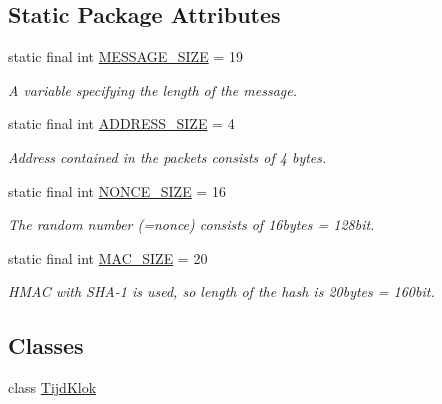 \subsection*{Static Package Attributes}
\begin{CompactItemize}
\item 
\hypertarget{class_kryptoknight_u0}{
static final int \hyperlink{class_kryptoknight_u0}{MESSAGE\_\-SIZE} = 19}
\label{class_kryptoknight_u0}

\begin{CompactList}\small\item\em A variable specifying the length of the message. \item\end{CompactList}\item 
\hypertarget{class_kryptoknight_u1}{
static final int \hyperlink{class_kryptoknight_u1}{ADDRESS\_\-SIZE} = 4}
\label{class_kryptoknight_u1}

\begin{CompactList}\small\item\em Address contained in the packets consists of 4 bytes. \item\end{CompactList}\item 
\hypertarget{class_kryptoknight_u2}{
static final int \hyperlink{class_kryptoknight_u2}{NONCE\_\-SIZE} = 16}
\label{class_kryptoknight_u2}

\begin{CompactList}\small\item\em The random number (=nonce) consists of 16bytes = 128bit. \item\end{CompactList}\item 
\hypertarget{class_kryptoknight_u3}{
static final int \hyperlink{class_kryptoknight_u3}{MAC\_\-SIZE} = 20}
\label{class_kryptoknight_u3}

\begin{CompactList}\small\item\em HMAC with SHA-1 is used, so length of the hash is 20bytes = 160bit. \item\end{CompactList}\end{CompactItemize}
\subsection*{Classes}
\begin{CompactItemize}
\item 
class \hyperlink{class_kryptoknight_1_1_tijd_klok}{Tijd\-Klok}
\end{CompactItemize}



